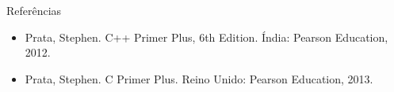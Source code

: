 

\begin{frame}{Referências}

\begin{itemize}
\item Prata, Stephen. C++ Primer Plus, 6th Edition. Índia: Pearson Education, 2012.
\item Prata, Stephen. C Primer Plus. Reino Unido: Pearson Education, 2013.
\end{itemize}





\end{frame}


